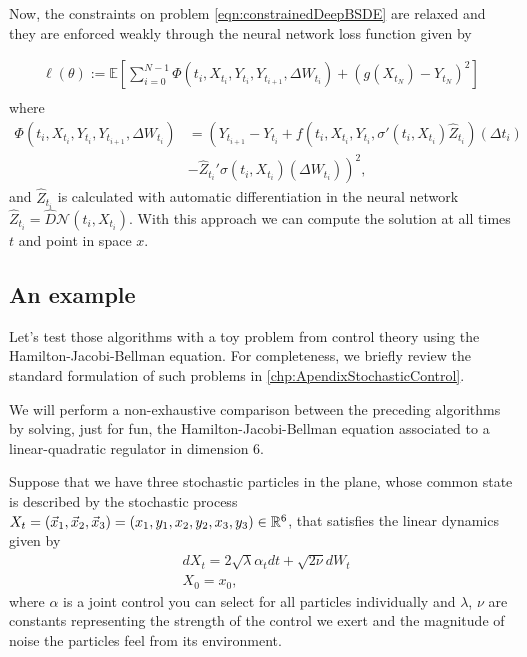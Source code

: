 Now, the constraints on problem \eqref{eqn:constrainedDeepBSDE} are relaxed and they are enforced weakly through the neural network loss function given by

\begin{equation}
	\begin{gathered}
		\ell(\theta):=\mathbb{E}\left[\sum_{i=0}^{N-1} \Phi\left(t_i, X_{t_i}, Y_{t_i}, Y_{t_{i+1}}, \Delta W_{t_{i}}\right)+\left(g\left(X_{t_N}\right)-Y_{t_N}\right)^2\right] \\
	\end{gathered}
\end{equation}
where 
\begin{equation}
	\begin{split}
		\Phi\left(t_i, X_{t_i}, Y_{t_i}, Y_{t_{i+1}}, \Delta W_{t_i}\right)&=\left(Y_{t_{i+1}}-Y_{t_i}+f\left(t_i, X_{t_i}, Y_{t_i}, \sigma'\left(t_i, X_{t_i}\right) \widehat{Z}_{t_i}\right)\left(\Delta t_i\right)\right. \\
		&\left.-\widehat{Z}_{t_i}' \sigma\left(t_i, X_{t_i}\right)\left(\Delta W_{t_i}\right)\right)^2,
	\end{split}
\end{equation}
and $\widehat{Z}_{t_i}$ is calculated with automatic differentiation in the neural network $\widehat{Z}_{t_i}=\hat{D}\mathcal{N}(t_i,X_{t_i})$. With this approach we can compute the solution at all times $t$ and point in space $x$.
\subsection{An example}
\label{subsec:example_LQR}
Let's test those algorithms with a toy problem from control theory using the Hamilton-Jacobi-Bellman equation. For completeness, we briefly review the standard formulation of such problems in \autoref{chp:ApendixStochasticControl}.


We will perform a non-exhaustive comparison between the preceding algorithms by solving, just for fun, the Hamilton-Jacobi-Bellman equation associated to a linear-quadratic regulator in dimension 6.

Suppose that we have three stochastic particles in the plane, whose common state is described by the stochastic process $X_t=(\vec{x}_1,\vec{x}_2,\vec{x}_3)=(x_1,y_1,x_2,y_2,x_3,y_3)\in\mathbb{R}^6$, that satisfies the linear dynamics given by 
\begin{equation}
	\begin{split}
		&dX_t=2\sqrt{\lambda}\alpha_t dt+\sqrt{2\nu}dW_t\\
		&X_0=x_0,
	\end{split} 
\end{equation} 
where $\alpha$ is a joint control you can select for all particles individually and $\lambda$, $\nu$ are constants representing the strength of the control we exert and the magnitude of noise the particles feel from its environment.  

